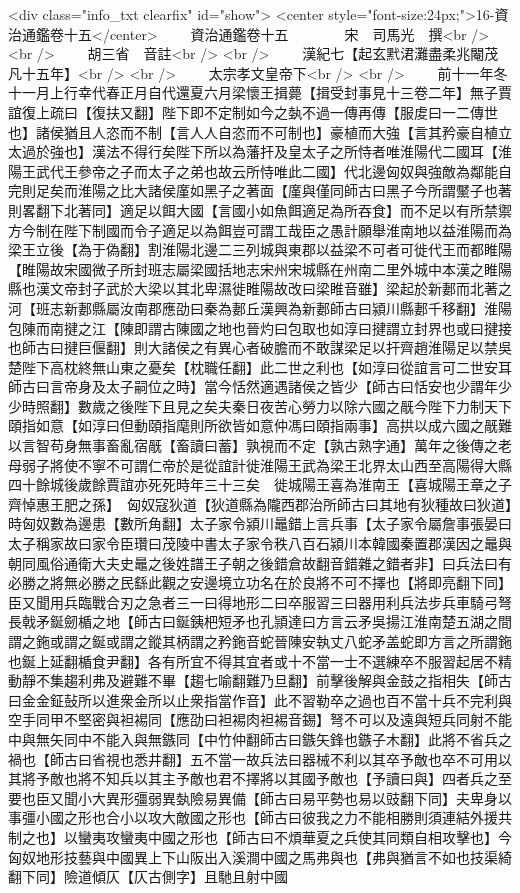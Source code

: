 <div class="info_txt clearfix" id="show">
<center style="font-size:24px;">16-資治通鑑卷十五</center>
  　　資治通鑑卷十五　　　　宋　司馬光　撰<br />
<br />
　　胡三省　音註<br />
<br />
　　漢紀七【起玄黓涒灘盡柔兆閹茂凡十五年】<br />
<br />
　　太宗孝文皇帝下<br />
<br />
　　前十一年冬十一月上行幸代春正月自代還夏六月梁懷王揖薨【揖受封事見十三卷二年】無子賈誼復上疏曰【復扶又翻】陛下即不定制如今之埶不過一傳再傳【服䖍曰一二傳世也】諸侯猶且人恣而不制【言人人自恣而不可制也】豪植而大強【言其矜豪自植立太過於強也】漢法不得行矣陛下所以為藩扞及皇太子之所恃者唯淮陽代二國耳【淮陽王武代王參帝之子而太子之弟也故云所恃唯此二國】代北邊匈奴與強敵為鄰能自完則足矣而淮陽之比大諸侯廑如黑子之著面【廑與僅同師古曰黑子今所謂黶子也著則畧翻下北著同】適足以餌大國【言國小如魚餌適足為所吞食】而不足以有所禁禦方今制在陛下制國而令子適足以為餌豈可謂工哉臣之愚計願舉淮南地以益淮陽而為梁王立後【為于偽翻】割淮陽北邊二三列城與東郡以益梁不可者可徙代王而都睢陽【睢陽故宋國微子所封班志屬梁國括地志宋州宋城縣在州南二里外城中本漢之睢陽縣也漢文帝封子武於大梁以其北卑濕徙睢陽故改曰梁睢音雖】梁起於新郪而北著之河【班志新郪縣屬汝南郡應劭曰秦為郪丘漢興為新郪師古曰潁川縣郪千移翻】淮陽包陳而南揵之江【陳即謂古陳國之地也晉灼曰包取也如淳曰揵謂立封界也或曰揵接也師古曰揵巨偃翻】則大諸侯之有異心者破膽而不敢謀梁足以扞齊趙淮陽足以禁吳楚陛下高枕終無山東之憂矣【枕職任翻】此二世之利也【如淳曰從誼言可二世安耳師古曰言帝身及太子嗣位之時】當今恬然適遇諸侯之皆少【師古曰恬安也少謂年少少時照翻】數歲之後陛下且見之矣夫秦日夜苦心勞力以除六國之旤今陛下力制天下頤指如意【如淳曰但動頤指麾則所欲皆如意仲馮曰頤指兩事】高拱以成六國之旤難以言智苟身無事畜亂宿旤【畜讀曰蓄】孰視而不定【孰古熟字通】萬年之後傳之老母弱子將使不寧不可謂仁帝於是從誼計徙淮陽王武為梁王北界太山西至高陽得大縣四十餘城後歲餘賈誼亦死死時年三十三矣　徙城陽王喜為淮南王【喜城陽王章之子齊悼惠王肥之孫】　匈奴寇狄道【狄道縣為隴西郡治所師古曰其地有狄種故曰狄道】時匈奴數為邊患【數所角翻】太子家令潁川鼂錯上言兵事【太子家令屬詹事張晏曰太子稱家故曰家令臣瓚曰茂陵中書太子家令秩八百石潁川本韓國秦置郡漢因之鼂與朝同風俗通衛大夫史鼂之後姓譜王子朝之後錯倉故翻音錯雜之錯者非】曰兵法曰有必勝之將無必勝之民繇此觀之安邊境立功名在於良將不可不擇也【將即亮翻下同】臣又聞用兵臨戰合刃之急者三一曰得地形二曰卒服習三曰器用利兵法步兵車騎弓弩長戟矛鋋劒楯之地【師古曰鋋銕杷短矛也孔頴達曰方言云矛吳揚江淮南楚五湖之間謂之鉇或謂之鋋或謂之鏦其柄謂之矜鉇音蛇晉陳安執丈八蛇矛盖蛇即方言之所謂鉇也鋋上延翻楯食尹翻】各有所宜不得其宜者或十不當一士不選練卒不服習起居不精動靜不集趨利弗及避難不畢【趨七喻翻難乃旦翻】前擊後解與金鼓之指相失【師古曰金金鉦鼔所以進衆金所以止衆指當作音】此不習勒卒之過也百不當十兵不完利與空手同甲不堅密與袒裼同【應劭曰袒裼肉袒裼音錫】弩不可以及遠與短兵同射不能中與無矢同中不能入與無鏃同【中竹仲翻師古曰鏃矢鋒也鏃子木翻】此將不省兵之禍也【師古曰省視也悉井翻】五不當一故兵法曰器械不利以其卒予敵也卒不可用以其將予敵也將不知兵以其主予敵也君不擇將以其國予敵也【予讀曰與】四者兵之至要也臣又聞小大異形彊弱異埶險易異備【師古曰易平勢也易以豉翻下同】夫卑身以事彊小國之形也合小以攻大敵國之形也【師古曰彼我之力不能相勝則須連結外援共制之也】以蠻夷攻蠻夷中國之形也【師古曰不煩華夏之兵使其同類自相攻擊也】今匈奴地形技藝與中國異上下山阪出入溪澗中國之馬弗與也【弗與猶言不如也技渠綺翻下同】險道傾仄【仄古側字】且馳且射中國